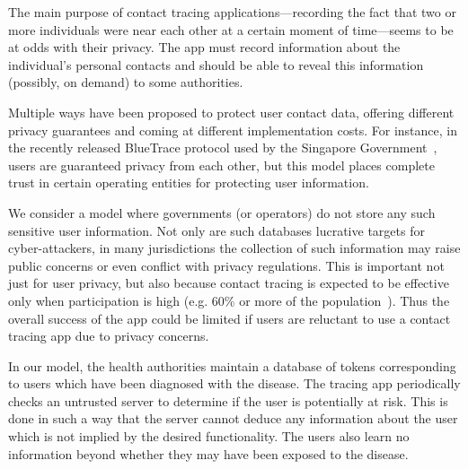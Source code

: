 The main purpose of contact tracing applications---recording the fact that two or more individuals were near each other at a certain moment of time---seems to be at odds with their privacy. The
app must record information about the individual's personal contacts and should be able to reveal this information (possibly, on demand) to some authorities. 



Multiple ways have been proposed to protect user contact data,
offering different privacy guarantees and coming at different
implementation costs. For instance, in the recently released BlueTrace protocol used by the Singapore Government~\cite{ttg}, users are guaranteed privacy from each other, but this model places complete trust in certain operating entities for protecting user information.


We consider a model where governments (or operators) do not store any such sensitive user information. Not only are such databases lucrative targets for cyber-attackers, in many jurisdictions the collection of such information may raise public concerns or even conflict with privacy regulations. This is important not just for user privacy, but also because contact tracing is expected to be effective only when participation is high (e.g. 60\% or more of the population~\cite{Ferretti2020}). Thus the overall success of the app could be limited if users are reluctant to use a contact tracing app due to privacy concerns.

In our model, the health authorities maintain a database of tokens corresponding to users which have been diagnosed with the disease. The tracing app periodically checks an untrusted server to determine if the user is potentially at risk. This is done in such a way that the server cannot deduce any information about the user which is not implied by the desired functionality. The users also learn no information beyond whether they may have been exposed to the disease.

